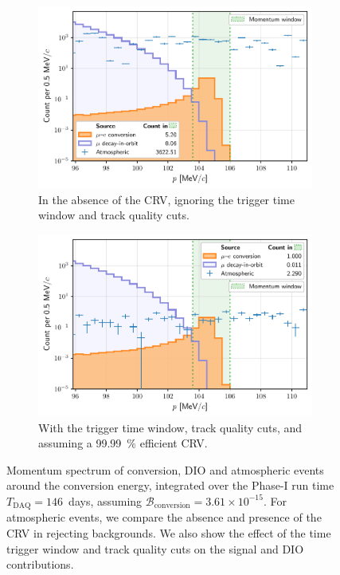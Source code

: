 \begin{figure}
    \centering
        
    \begin{subfigure}[t]{0.49\textwidth}
        \centering
        \includegraphics[width=\textwidth]{chapter6/thesis_conversion_search_momentum_distribution_nocuts_v5.pdf}
        \caption{ In the absence of the CRV, ignoring the trigger time window
            and track quality cuts.}
        \label{fig:log_spectrum_nocuts}
    \end{subfigure}
    \hfill
    \begin{subfigure}[t]{0.49\textwidth}
        \centering
        \includegraphics[width=\textwidth]{chapter6/thesis_conversion_search_momentum_distribution_withcuts_except_directionID.pdf}
        \caption{ With the trigger time window, track quality cuts, and assuming
            a \SI{99.99}{\percent} efficient CRV. 
        }
        \label{fig:log_spectrum_cuts_except_directionID}
    \end{subfigure}
    \caption{ Momentum spectrum of conversion, DIO and atmospheric events around
    the conversion energy, integrated over the Phase-I run time $T_\mathrm{DAQ}
    = 146$~days, assuming $\mathcal{B}_\mathrm{conversion} = 3.61\times
    10^{-15}$. For atmospheric events, we compare the absence and presence of
    the CRV in rejecting backgrounds. We also show the effect of the time
    trigger window and track quality cuts on the signal and DIO contributions. }
    \label{fig:log_spectra}
\end{figure}

